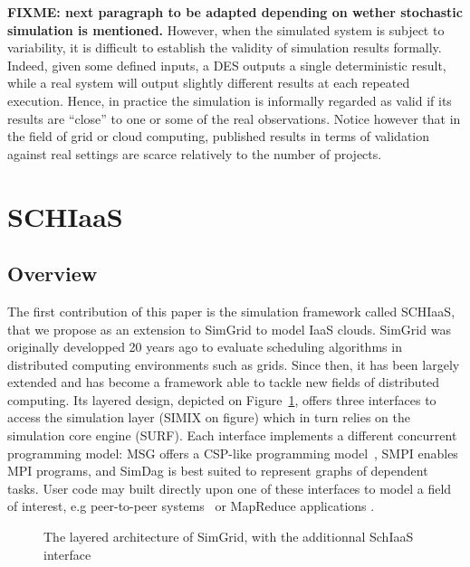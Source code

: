 \textbf{FIXME: next paragraph to be adapted depending on wether stochastic
  simulation is mentioned.}
However, when the simulated system is subject to variability, it is difficult to
establish  the  validity of  simulation  results  formally. Indeed,  given  some
defined inputs, a DES outputs a single deterministic result, while a real system
will output  slightly different results  at each repeated execution.   Hence, in
practice  the simulation  is informally  regarded as  valid if  its results  are
``close'' to one or  some of the real observations.  Notice  however that in the
field  of grid  or cloud  computing, published  results in  terms of  validation
against real settings are scarce relatively to the number of projects.



\section{SCHIaaS}
\label{sc:schiaas}

\subsection{Overview}
The first contribution of this paper is the simulation framework called SCHIaaS,
that we  propose as an  extension to SimGrid to  model IaaS clouds.  SimGrid was
originally  developped  20  years  ago  to  evaluate  scheduling  algorithms  in
distributed  computing environments  such as  grids.   Since then,  it has  been
largely  extended and  has  become a  framework  able to  tackle  new fields  of
distributed     computing.      Its      layered     design,     depicted     on
Figure~\ref{fg:sg-archi}, offers three interfaces to access the simulation layer
(SIMIX on  figure) which in  turn relies on  the simulation core  engine (SURF).
Each interface implements a different concurrent programming model: MSG offers a
CSP-like programming model~\cite{Hoare78}, SMPI enables MPI programs, and SimDag
is best  suited to  represent graphs  of dependent tasks.   User code  may built
directly  upon  one of  these  interfaces  to model  a  field  of interest,  e.g
peer-to-peer     systems~\cite{QuinsonRT12}     or    MapReduce     applications
\cite{KolbergMAMGA13}.
%
\begin{figure}[hbt]
\centering
\resizebox{.6\textwidth}{!}{%

}
\caption{The  layered  architecture of  SimGrid,  with  the additionnal  SchIaaS
  interface}
\label{fg:sg-archi}
\end{figure}


